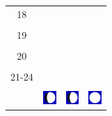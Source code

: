 \documentclass[twoside, a4paper,12pt, tikz]{scrartcl}
\begin{document}
\begin{tabularx}{\linewidth}{|c|X|X|X|}
        &   &       &    \\
      \hline
      18&   &       &    \\
        &   &       &    \\
      \hline
      19&   &       &    \\
        &   &       &    \\
      \hline
      20&   &       &    \\
        &   &       &    \\
      \hline
      21-24&   &       &    \\
        &   &       &    \\
      \hline  
      & \vspace{0.01cm} \centerline{\includegraphics[width=0.5cm]{moon_phases/Moon_phase_3.svg.png}} \vspace{0.1cm} & \vspace{0.01cm} \centerline{\includegraphics[width=0.5cm]{moon_phases/Moon_phase_3.svg.png}} \vspace{0.1cm} & \vspace{0.01cm} \centerline{\includegraphics[width=0.5cm]{moon_phases/Moon_phase_4.svg.png}} \vspace{0.1cm}\\
      \hline   
    \end{tabularx}




    \newpage

        \noindent
\end{document}
